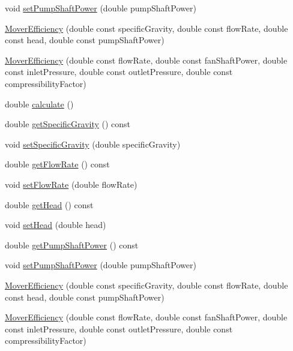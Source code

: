 \begin{DoxyCompactItemize}
\item 
void \hyperlink{class_mover_efficiency_afc2fea6487106318d441a0130ed2934d}{set\+Pump\+Shaft\+Power} (double pump\+Shaft\+Power)
\item 
\hyperlink{class_mover_efficiency_a582aada664da565f184c319d9304596f}{Mover\+Efficiency} (double const specific\+Gravity, double const flow\+Rate, double const head, double const pump\+Shaft\+Power)
\item 
\hyperlink{class_mover_efficiency_a275951aede53c027e5d25589d401caa5}{Mover\+Efficiency} (double const flow\+Rate, double const fan\+Shaft\+Power, double const inlet\+Pressure, double const outlet\+Pressure, double const compressibility\+Factor)
\item 
double \hyperlink{class_mover_efficiency_ae7b997f1e2fcff1d4263e9921c1a8d9b}{calculate} ()
\item 
double \hyperlink{class_mover_efficiency_a4acdd89fec01daef4902238202e00884}{get\+Specific\+Gravity} () const
\item 
void \hyperlink{class_mover_efficiency_aed095f525636345bdfebe76774afa2d4}{set\+Specific\+Gravity} (double specific\+Gravity)
\item 
double \hyperlink{class_mover_efficiency_a3b0d468a68703127624ab996f03d2368}{get\+Flow\+Rate} () const
\item 
void \hyperlink{class_mover_efficiency_a35bf328fcd7e8334d552bce8b8704379}{set\+Flow\+Rate} (double flow\+Rate)
\item 
double \hyperlink{class_mover_efficiency_a9ce5f2dba38ae4f271bdb2c018667144}{get\+Head} () const
\item 
void \hyperlink{class_mover_efficiency_a1dce269494ecdfc348c8d0a3f9d33df6}{set\+Head} (double head)
\item 
double \hyperlink{class_mover_efficiency_a367c3cb3a070cef9de5e3ca87bbf62fe}{get\+Pump\+Shaft\+Power} () const
\item 
void \hyperlink{class_mover_efficiency_afc2fea6487106318d441a0130ed2934d}{set\+Pump\+Shaft\+Power} (double pump\+Shaft\+Power)
\item 
\hyperlink{class_mover_efficiency_a582aada664da565f184c319d9304596f}{Mover\+Efficiency} (double const specific\+Gravity, double const flow\+Rate, double const head, double const pump\+Shaft\+Power)
\item 
\hyperlink{class_mover_efficiency_a275951aede53c027e5d25589d401caa5}{Mover\+Efficiency} (double const flow\+Rate, double const fan\+Shaft\+Power, double const inlet\+Pressure, double const outlet\+Pressure, double const compressibility\+Factor)

\end{DoxyCompactItemize}
